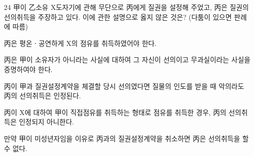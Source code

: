 \begin{question}{24}
甲이 乙소유 X도자기에 관해 무단으로 丙에게 질권을 설정해 주었고, 丙은 질권의 선의취득을 주장하고 있다. 이에 관한 설명으로 옳지 않은 것은? (다툼이 있으면 판례에 따름)
\begin{choices}
  \item 丙은 평온ㆍ공연하게 X의 점유를 취득하였어야 한다.
  \item 丙은 甲이 소유자가 아니라는 사실에 대하여 그 자신이 선의이고 무과실이라는 사실을 증명하여야 한다.
  \item 丙이 甲과 질권설정계약을 체결할 당시 선의였다면 질물의 인도를 받을 때 악의라도 丙의 선의취득은 인정된다.
  \item 丙이 X에 대하여 甲이 직접점유를 취득하는 형태로 점유를 취득한 경우, 丙의 선의취득은 인정되지 아니한다.
  \item 만약 甲이 미성년자임을 이유로 丙과의 질권설정계약을 취소하면 丙은 선의취득을 할 수 없다.
\end{choices}
\end{question}
